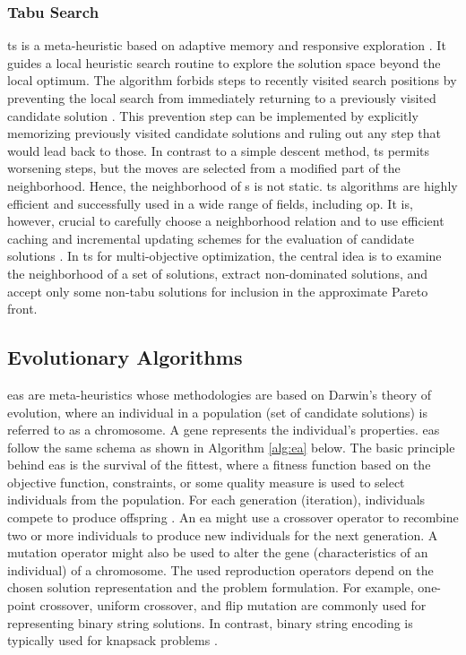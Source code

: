 \subsubsection{Tabu Search}
\Gls{ts} is a meta-heuristic based on adaptive memory and responsive exploration \parencite{Gonzalez2007HandbookMetaheuristics}. It guides a local heuristic search routine to explore the solution space beyond the local optimum. The algorithm forbids steps to recently visited search positions by preventing the local search from immediately returning to a previously visited candidate solution \parencite{HolgerH2005StochasticSearch}. This prevention step can be implemented by explicitly memorizing previously visited candidate solutions and ruling out any step that would lead back to those. In contrast to a simple descent method, \gls{ts} permits worsening steps, but the moves are selected from a modified part of the neighborhood. Hence, the neighborhood of s is not static. \gls{ts} algorithms are highly efficient and successfully used in a wide range of fields, including \gls{op}. It is, however, crucial to carefully choose a neighborhood relation and to use efficient caching and incremental updating schemes for the evaluation of candidate solutions \parencite{HolgerH2005StochasticSearch}. In \gls{ts} for multi-objective optimization, the central idea is to examine the neighborhood of a set of solutions, extract non-dominated solutions, and accept only some non-tabu solutions for inclusion in the approximate Pareto front. 

\subsection{Evolutionary Algorithms}
\Glspl{ea} are meta-heuristics whose methodologies are based on Darwin’s theory of evolution, where an individual in a population (set of candidate solutions) is referred to as a chromosome. A gene represents the individual’s properties. \glspl{ea} follow the same schema as shown in Algorithm \ref{alg:ea} \parencite{Gonzalez2007HandbookMetaheuristics} below. The basic principle behind \glspl{ea} is the survival of the fittest, where a fitness function based on the objective function, constraints, or some quality measure is used to select individuals from the population. For each generation (iteration), individuals compete to produce offspring \parencite{Engelbrecht2007ComputationalEdition}. An \gls{ea} might use a crossover operator to recombine two or more individuals to produce new individuals for the next generation. A mutation operator might also be used to alter the gene (characteristics of an individual) of a chromosome. The used reproduction operators depend on the chosen solution representation and the problem formulation. For example, one-point crossover, uniform crossover, and flip mutation are commonly used for representing binary string solutions. In contrast, binary string encoding is typically used for knapsack problems \parencite{Gonzalez2007HandbookMetaheuristics}.  

